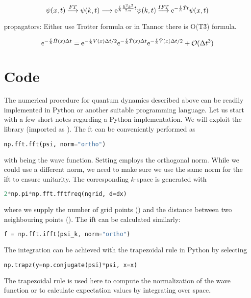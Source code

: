 \begin{equation}
    \psi(x,t) \stackrel{FT}{\longrightarrow} \psi(k,t) \longrightarrow \mathrm{e}^{\frac{i}{\hbar} \frac{\hbar^2 k^2}{2m} t} \psi(k,t) \stackrel{IFT}{\longrightarrow} \mathrm{e}^{-\frac{i}{\hbar} \hat{T} t}\psi(x,t)
\end{equation}

propagators:
Either use Trotter formula or in Tannor there is O(T\^3) formula.

\begin{equation}
    \mathrm{e}^{-\frac{i}{\hbar}\hat{H}(x)\Delta t} = \mathrm{e}^{-\frac{i}{\hbar}V(x)\Delta t/2}\mathrm{e}^{-\frac{i}{\hbar}\hat{T}(x)\Delta t}\mathrm{e}^{-\frac{i}{\hbar}\hat{V}(x)\Delta t/2} + \mathcal{O}(\Delta t^3)
\end{equation}


\section{Code}

The numerical procedure for quantum dynamics described above can be readily implemented in Python or another suitable programming language. Let us start with a few short notes regarding a Python implementation. We will exploit the  library (imported as ). The \acrlong{ft} can be conveniently performed as
\begin{lstlisting}[language=Python, style=mystyle2]
np.fft.fft(psi, norm="ortho")
\end{lstlisting}
with  being the wave function. Setting  employs the orthogonal norm. While we could use a different norm, we need to make sure we use the same norm for the \acrshort{ift} to ensure unitarity. The corresponding $k$-space is generated with
\begin{lstlisting}[language=Python, style=mystyle2]
2*np.pi*np.fft.fftfreq(ngrid, d=dx)
\end{lstlisting}
where we supply the number of grid points () and the distance between two neighbouring points (). The \acrlong{ift} can be calculated similarly: 
\begin{lstlisting}[language=Python, style=mystyle2]
f = np.fft.ifft(psi_k, norm="ortho")
\end{lstlisting}

The integration can be achieved with the trapezoidal rule in Python by selecting
\begin{lstlisting}[language=Python, style=mystyle2]
np.trapz(y=np.conjugate(psi)*psi, x=x)
\end{lstlisting}
The trapezoidal rule is used here to compute the normalization of the wave function or to calculate expectation values by integrating over space.

